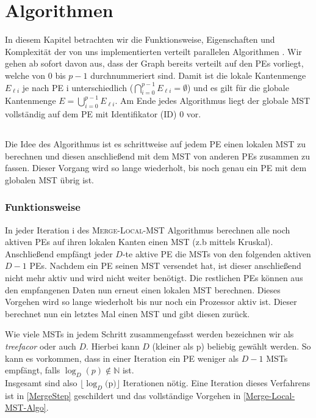 \section{Algorithmen}\label{Algorithms}
In diesem Kapitel betrachten wir die Funktionsweise, Eigenschaften und Komplexität der von uns implementierten verteilt parallelen Algorithmen \cite{adler1998communication, dehne1998practical}.
Wir gehen ab sofort davon aus, dass der Graph bereits verteilt auf den PEs vorliegt, welche von $0$ bis $p-1$ durchnummeriert sind.
Damit ist die lokale Kantenmenge $E_{\ell i}$ je nach PE i unterschiedlich ($\bigcap_{i=0}^{p-1} E_{\ell i}=\emptyset$) und es gilt für die globale Kantenmenge $E = \bigcup_{i=0}^{p-1} E_{\ell i}$.
Am Ende jedes Algorithmus liegt der globale MST vollständig auf dem PE mit Identifikator (ID) 0 vor.

\subsection{\mergeMST}
Die Idee des \mergeMST Algorithmus ist es schrittweise auf jedem PE einen lokalen MST zu berechnen und diesen anschließend mit dem MST von anderen PEs zusammen zu fassen. Dieser Vorgang wird so lange wiederholt, bis noch genau ein PE mit dem globalen MST übrig ist.


\subsubsection{Funktionsweise}
In jeder Iteration i des  \textsc{Merge-Local-MST} Algorithmus berechnen alle noch aktiven PEs auf ihren lokalen Kanten einen MST (z.b mittels Kruskal). Anschließend empfängt jeder $D$-te aktive PE die MSTs von den folgenden aktiven $D-1$ PEs. Nachdem ein PE seinen MST versendet hat, ist dieser anschließend nicht mehr aktiv und wird nicht weiter benötigt. Die restlichen PEs können aus den empfangenen Daten nun erneut einen lokalen MST berechnen.
Dieses Vorgehen wird so lange wiederholt bis nur noch ein Prozessor aktiv ist. Dieser berechnet nun ein letztes Mal einen MST und gibt diesen zurück.

Wie viele MSTs in jedem Schritt zusammengefasst werden bezeichnen wir als \emph{treefacor} oder auch $D$. Hierbei kann $D$ (kleiner als p) beliebig gewählt werden. So kann es vorkommen, dass in einer Iteration ein PE weniger als $D-1$ MSTs empfängt, falls $\log_D(p) \notin \mathbb{N}$ ist.\\
Insgesamt sind also $\lfloor \log_{D}($p$) \rfloor $ Iterationen nötig.
Eine Iteration dieses Verfahrens ist in \cref{MergeStep} geschildert und das vollständige Vorgehen in \cref{Merge-Local-MST-Algo}.


